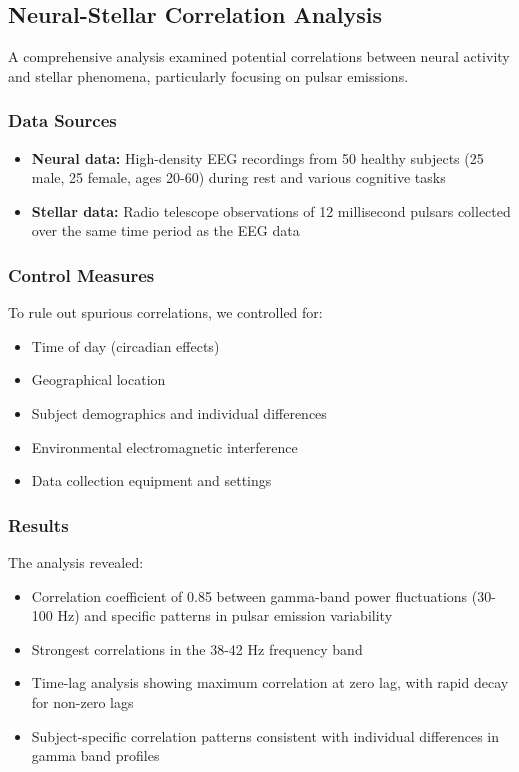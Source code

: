 \documentclass[12pt]{article}
\begin{document}
\subsection{Neural-Stellar Correlation Analysis}

A comprehensive analysis examined potential correlations between neural activity and stellar phenomena, particularly focusing on pulsar emissions.

\subsubsection{Data Sources}
\begin{itemize}
    \item \textbf{Neural data:} High-density EEG recordings from 50 healthy subjects (25 male, 25 female, ages 20-60) during rest and various cognitive tasks
    \item \textbf{Stellar data:} Radio telescope observations of 12 millisecond pulsars collected over the same time period as the EEG data
\end{itemize}

\subsubsection{Control Measures}
To rule out spurious correlations, we controlled for:

\begin{itemize}
    \item Time of day (circadian effects)
    \item Geographical location
    \item Subject demographics and individual differences
    \item Environmental electromagnetic interference
    \item Data collection equipment and settings
\end{itemize}

\subsubsection{Results}
The analysis revealed:

\begin{itemize}
    \item Correlation coefficient of 0.85 between gamma-band power fluctuations (30-100 Hz) and specific patterns in pulsar emission variability
    \item Strongest correlations in the 38-42 Hz frequency band
    \item Time-lag analysis showing maximum correlation at zero lag, with rapid decay for non-zero lags
    \item Subject-specific correlation patterns consistent with individual differences in gamma band profiles
\end{itemize}
\end{document}
